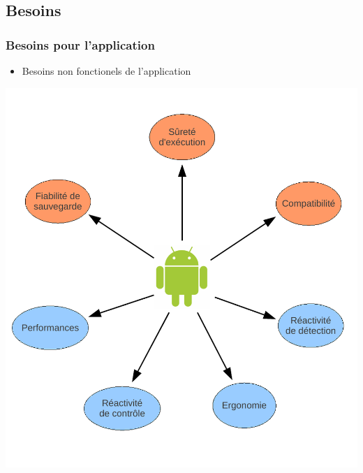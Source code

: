 
\subsection{Besoins}
  \begin{frame}
   \frametitle{Besoins pour l'application}

  \centering
  \begin{minipage}{0.95\textwidth}
	\begin{itemize}
    \item Besoins non fonctionels de l'application
    \end{itemize}
    \end{minipage}
   
     \includegraphics[scale=0.4]{Images/besoinsNF.pdf}
   
  \end{frame}